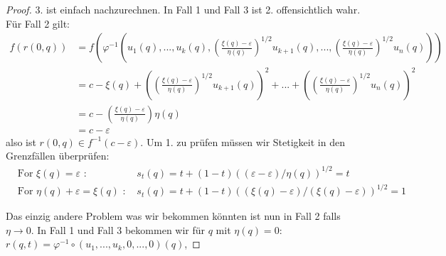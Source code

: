 \documentclass[a4paper,11pt]{article}
\begin{document}
\begin{proof}
    3. ist einfach nachzurechnen. In Fall 1 und Fall 3 ist 2. offensichtlich
    wahr. Für Fall 2 gilt:
    \begin{align*} 
        f(r(0, q)) & = 
            f\left( \varphi^{-1} \left(u_1(q), ..., u_k(q), 
            \left( \frac{\xi(q) - \varepsilon}{\eta(q)} \right)^{1/2}u_{k + 1}(q), ...,
            \left( \frac{\xi(q) - \varepsilon}{\eta(q)} \right)^{1/2}u_n(q)
            \right)
            \right) \\
        & = c - \xi(q)
            + \left( \left( \frac{\xi(q) - \varepsilon}{\eta(q)} \right)^{1/2}u_{k + 1}(q) \right)^2 + ... 
            + \left( \left( \frac{\xi(q) - \varepsilon}{\eta(q)} \right)^{1/2}u_n(q) \right)^2 \\
        & = c - \left( \frac{\xi(q) - \varepsilon}{\eta(q)} \right) \eta(q) \\
        & = c - \varepsilon
    \end{align*}
    also ist $r(0, q) \in f^{-1}(c - \varepsilon)$. Um 1. zu prüfen müssen wir 
    Stetigkeit in den Grenzfällen überprüfen:
    \begin{align*}
        & \text{For } \xi(q) = \varepsilon \text{ : }
            & s_t(q)  =t + (1 - t)((\varepsilon - \varepsilon)/\eta(q))^{1/2} = t \\
        & \text{For } \eta(q) + \varepsilon = \xi(q) \text{ : }
            & s_t(q) = t + (1 - t)((\xi(q) - \varepsilon)/(\xi(q) - \varepsilon))^{1/2} = 1
    \end{align*}

    Das einzig andere Problem was wir bekommen könnten ist nun in Fall 2 falls
    $\eta \to 0$. In Fall 1 und Fall 3 bekommen wir für $q$ mit $\eta(q) = 0$:
    $r(q, t) = \varphi^{-1} \circ (u_1, ..., u_k, 0, ..., 0)(q)$, 

\end{proof}
\end{document}
